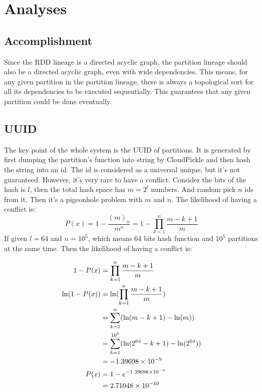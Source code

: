 
\section{Analyses} %
\label{sec:analyses}

\subsection{Accomplishment} %
\label{sub:accomplishment}
Since the RDD lineage is a directed acyclic graph,
the partition lineage should also be a directed acyclic graph, even with wide dependencies.
This means, for any given partition in the partition lineage,
there is always a topological sort for all its dependencies to be executed sequentially.
This guarantees that any given partition could be done eventually.

\subsection{UUID} %
\label{sub:uuid}
The key point of the whole system is the UUID of partitions.
It is generated by first dumping the partition's function into string by CloudPickle and then hash the string into an id.
The id is considered as a universal unique, but it's not guaranteed.
However, it's very rare to have a conflict.
Consider the bits of the hash is $l$, then the total hash space has $m=2^l$ numbers.
And random pick $n$ ids from it.
Then it's a pigeonhole problem\cite{pigeonhole} with $m$ and $n$.
The likelihood of having a conflict is:
$$P(x) = 1 - \frac{{(m)}_{n}}{m^{n}} = 1 - \prod\limits_{k = 1}^n\frac{m - k + 1}{m}$$
If given $l=64$ and $n=10^5$, which means 64 bits hash function and $10^5$ partitions at the same time.
Then the likelihood of having a conflict is:

\begin{align*}
1 - P(x) &= \prod\limits_{k = 1}^n\frac{m - k + 1}{m} \\
\ln(1 - P(x)) &= \ln(\prod\limits_{k = 1}^n\frac{m - k + 1}{m}) \\
&= \sum\limits_{k = 1}^n(\ln(m - k + 1) - \ln(m)) \\
&= \sum\limits_{k = 1}^{10^5}(\ln(2^{64} - k + 1) - \ln(2^{64})) \\
&= -1.39698\times 10^{-9} \\
P(x) &= 1 - e^{-1.39698\times 10^{-9}} \\
&= 2.71048\times 10^{-10}
\end{align*}

